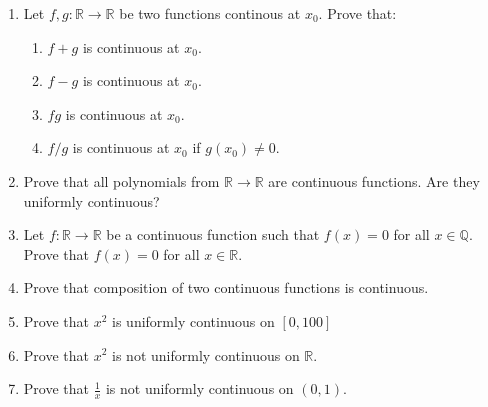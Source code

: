 \documentclass[12pt]{article}
\begin{document}
\begin{enumerate}
    \item Let $f,g:\mathbb{R}\to\mathbb{R}$ be two functions continous at $x_0$. Prove that:
    \begin{enumerate}
        \item \( f+g \) is continuous at \( x_0 \).
        \item \( f-g \) is continuous at \( x_0 \).
        \item \( fg \) is continuous at \( x_0 \).
        \item \( f/g \) is continuous at \( x_0 \) if \( g(x_0) \neq 0 \).
    \end{enumerate}
    \item Prove that all polynomials from \( \mathbb{R} \to \mathbb{R} \) are continuous functions. Are they uniformly continuous?
    \item Let \( f:\mathbb{R}\to\mathbb{R} \) be a continuous function such that \( f(x) = 0 \) for all \( x \in \mathbb{Q} \). Prove that \( f(x) = 0 \) for all \( x \in \mathbb{R} \).
    \item Prove that composition of two continuous functions is continuous.
    \item Prove that $x^2$ is uniformly continuous on $[0,100]$
    \item Prove that $x^2$ is not uniformly continuous on $\mathbb{R}$.
    \item Prove that $\frac{1}{x}$ is not uniformly continuous on $(0, 1)$.
\end{enumerate}
\end{document}
